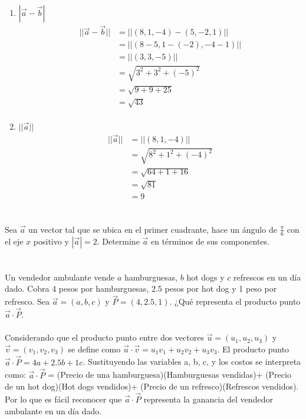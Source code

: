 \documentclass[12pt]{article}
\begin{document}
\begin{itemize}
\begin{enumerate}
\item $|\vec{a} - \vec{b}|$
   \begin{equation*}
  \begin{split}
    ||\vec{a} - \vec{b}|| &= ||(8, 1, -4) - (5, -2, 1)|| \\
    &= ||(8-5, 1-(-2), -4-1) || \\
    &= ||(3, 3, -5)|| \\
    &= \sqrt{3^2 + 3^2 + (-5)^2} \\
    &= \sqrt{9 + 9 + 25} \\
    &= \sqrt{43} \\
  \end{split}
  \end{equation*}

\item $||\vec{a}||$
  \begin{equation*}
  \begin{split}
    ||\vec{a}|| &= ||(8, 1, -4)|| \\
    &= \sqrt{8^2 + 1^2 + (-4)^2} \\
    &= \sqrt{64 + 1 + 16} \\
    &= \sqrt{81} \\
    &= 9
  \end{split}
  \end{equation*}
\end{enumerate}
\section{}

Sea $\vec{a}$ un vector tal que se ubica en el primer cuadrante, hace un ángulo de $\frac{\pi}{6}$ con el eje $x$ positivo  y $|\vec{a}|=2$. Determine $\vec{a}$ en términos de sus componentes.


\section{}

Un vendedor ambulante vende $a$ hamburguesas, $b$ hot dogs y $c$ refrescos en un día dado. Cobra 4 pesos por hamburguesas, 2.5 pesos por hot dog y 1 peso por refresco. Sea $\vec{a}=(a,b,c)$ y $\vec{P}=(4,2.5,1)$. ¿Qué representa el producto punto $\vec{a} \cdot \vec{P}$. \\ \\
Considerando que el producto punto entre dos vectores $\vec{u} = (u_1, u_2, u_3)$ y  $\vec{v} = (v_1, v_2, v_3)$ se define como $\vec{u} \cdot \vec{v} = u_1v_1 + u_2v_2+u_3v_3$. El producto punto  $\vec{a} \cdot \vec{P} = 4a+ 2.5b+1c$.
Sustituyendo las variables a, b, c, y los costos se interpreta como:
$\vec{a} \cdot \vec{P}$ = (Precio de una hamburguesa)(Hamburguesas vendidas)+ (Precio de un hot dog)(Hot dogs vendidos)+ (Precio de un refresco)(Refrescos vendidos).
\\Por lo que es fácil reconocer que $\vec{a} \cdot \vec{P}$ representa la ganancia del vendedor ambulante en un día dado.



\end{itemize}
\end{document}
